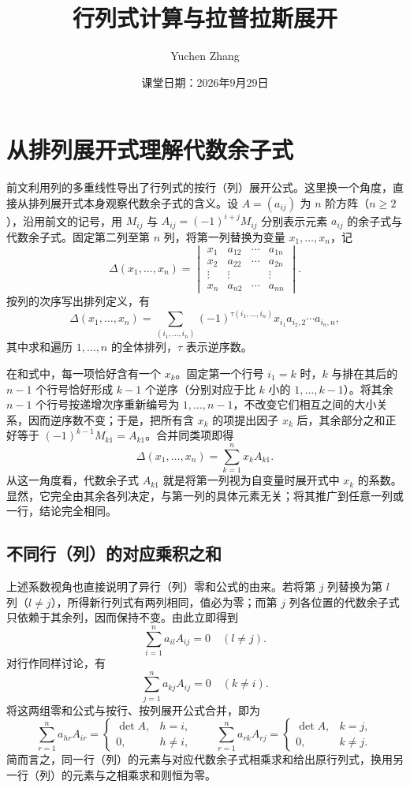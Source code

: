 \documentclass[UTF8, fontset=fandol, a4paper, 12pt]{ctexart}
\title{行列式计算与拉普拉斯展开}
\author{Yuchen Zhang}
\date{课堂日期：2026年9月29日}
\makeatletter
\theoremstyle{definition}
\renewcommand{\maketitle}{%
  \begin{center}
    {\LARGE\bfseries \@title\par}\vspace{0.6em}
    \@author\par\vspace{0.2em}
    {\small \@date\par}
  \end{center}
}
\makeatother
\begin{document}
\maketitle

\section{从排列展开式理解代数余子式}

前文利用列的多重线性导出了行列式的按行（列）展开公式。这里换一个角度，直接从排列展开式本身观察代数余子式的含义。设 $A=(a_{ij})$ 为 $n$ 阶方阵（$n\ge2$），沿用前文的记号，用 $M_{ij}$ 与 $A_{ij}=(-1)^{i+j}M_{ij}$ 分别表示元素 $a_{ij}$ 的余子式与代数余子式。固定第二列至第 $n$ 列，将第一列替换为变量 $x_1,\ldots,x_n$，记
\[
 \Delta(x_1,\ldots,x_n)=
 \begin{vmatrix}x_1&a_{12}&\cdots&a_{1n}\\x_2&a_{22}&\cdots&a_{2n}\\
 \vdots&\vdots&&\vdots\\x_n&a_{n2}&\cdots&a_{nn}\end{vmatrix}.
\]
按列的次序写出排列定义，有
\[
 \Delta(x_1,\ldots,x_n)
 =\sum_{(i_1,\ldots,i_n)}(-1)^{\tau(i_1,\ldots,i_n)}
 x_{i_1}a_{i_2,2}\cdots a_{i_n,n},
\]
其中求和遍历 $1,\ldots,n$ 的全体排列，$\tau$ 表示逆序数。

在和式中，每一项恰好含有一个 $x_k$。固定第一个行号 $i_1=k$ 时，$k$ 与排在其后的 $n-1$ 个行号恰好形成 $k-1$ 个逆序（分别对应于比 $k$ 小的 $1,\ldots,k-1$）。将其余 $n-1$ 个行号按递增次序重新编号为 $1,\ldots,n-1$，不改变它们相互之间的大小关系，因而逆序数不变；于是，把所有含 $x_k$ 的项提出因子 $x_k$ 后，其余部分之和正好等于 $(-1)^{k-1}M_{k1}=A_{k1}$。合并同类项即得
\[
 \Delta(x_1,\ldots,x_n)=\sum_{k=1}^n x_k A_{k1}.
\]
从这一角度看，代数余子式 $A_{k1}$ 就是将第一列视为自变量时展开式中 $x_k$ 的系数。显然，它完全由其余各列决定，与第一列的具体元素无关；将其推广到任意一列或一行，结论完全相同。

\subsection{不同行（列）的对应乘积之和}

上述系数视角也直接说明了异行（列）零和公式的由来。若将第 $j$ 列替换为第 $l$ 列（$l\ne j$），所得新行列式有两列相同，值必为零；而第 $j$ 列各位置的代数余子式只依赖于其余列，因而保持不变。由此立即得到
\[
 \sum_{i=1}^n a_{il}A_{ij}=0\quad(l\ne j).
\]
对行作同样讨论，有
\[
 \sum_{j=1}^n a_{kj}A_{ij}=0\quad(k\ne i).
\]
将这两组零和公式与按行、按列展开公式合并，即为
\[
 \sum_{r=1}^n a_{hr}A_{ir}
 =\begin{cases}\det A,&h=i,\\0,&h\ne i,\end{cases}
 \qquad
 \sum_{r=1}^n a_{rk}A_{rj}
 =\begin{cases}\det A,&k=j,\\0,&k\ne j.\end{cases}
\]
简而言之，同一行（列）的元素与对应代数余子式相乘求和给出原行列式，换用另一行（列）的元素与之相乘求和则恒为零。
\end{document}
